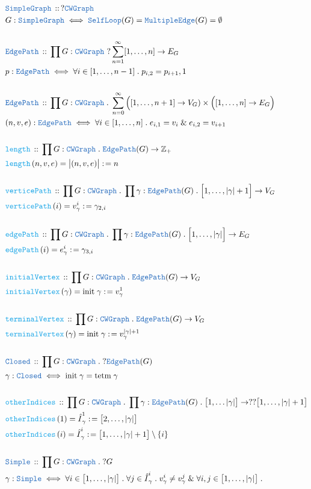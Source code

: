 \documentclass[12pt]{scrartcl}
\newcommand{\TYPE}[1]{\textcolor{NavyBlue}{\mathtt{#1}}}
\newcommand{\FUNC}[1]{\textcolor{Cerulean}{\mathtt{#1}}}
\renewcommand{\.}{\; . \;}
\newcommand{\de}{: \kern 0.1pc =}
\newcommand{\Act}[1]{\left( #1 \right)}
\newcommand{\DeclareType}[2]{& \TYPE{#1} \, :: \, #2 \\}
\newcommand{\DefineType}[3]{& #1 : \TYPE{#2} \iff #3 \\}
\newcommand{\DeclareFunc}[2]{& \FUNC{#1} \, :: \, #2 \\}
\newcommand{\DefineNamedFunc}[4]{&  \FUNC{#1}\Act{#2} = #3 \de #4 \\}
\newcommand{\Page}[1]{ \begin{align*} #1 \end{align*}   }
\renewcommand{\And}{\; \& \;}
\newcommand{\Int}{\mathbb{Z} }
\begin{document}
{}\Page{
	\DeclareType{SimpleGraph}{ ? \TYPE{CWGraph} }
	\DefineType{G}{SimpleGraph}{\TYPE{SelfLoop}(G) = \TYPE{MultipleEdge}(G) = \emptyset }
	\\
	\DeclareType{EdgePath}{\prod G : \TYPE{CWGraph} \ ? \sum^\infty_{n=1} [1,\ldots,n] \to E_G}
	\DefineType{p}{EdgePath}{\forall i \in [1,\ldots,n-1] \. p_{i,2} = p_{i+1},1}
	\\
	\DeclareType{EdgePath}{
		\prod G : \TYPE{CWGraph} \.  
		\sum^\infty_{n=0} 
		\Big([1,\ldots,n+1] \to V_G) \times
		\Big([1,\ldots,n] \to E_G \Big) 
	}
	\DefineType{(n,v,e)}{EdgePath}{\forall i \in [1,\ldots,n] \. e_{i,1} = v_i \And e_{i,2} = v_{i+1} }
	\\
	\DeclareFunc{length}{\prod G : \TYPE{CWGraph} \. \TYPE{EdgePath}(G) \to \Int_+}
	\DefineNamedFunc{length}{n,v,e}{\big|(n,v,e)\big|}{n}
	\\
	\DeclareFunc{verticePath}{\prod G : \TYPE{CWGraph} \. \prod \gamma :  \TYPE{EdgePath}(G) \. \Big[1,\ldots,|\gamma|+1\Big] \to V_G}
	\DefineNamedFunc{verticePath}{i}{v_\gamma^i}{\gamma_{2,i}} 
	\\
	\DeclareFunc{edgePath}{\prod G : \TYPE{CWGraph} \. \prod \gamma :  \TYPE{EdgePath}(G) \. \Big[1,\ldots,|\gamma|\Big] \to E_G}
	\DefineNamedFunc{edgePath}{i}{e_\gamma^i}{\gamma_{3,i}}
	\\
	\DeclareFunc{initialVertex}{\prod G : \TYPE{CWGraph} \. \TYPE{EdgePath}(G) \to V_G}
	\DefineNamedFunc{initialVertex}{\gamma}{\mathrm{init}\;\gamma}{v_\gamma^1}
	\\
	\DeclareFunc{terminalVertex}{\prod G : \TYPE{CWGraph} \. \TYPE{EdgePath}(G) \to V_G}
	\DefineNamedFunc{terminalVertex}{\gamma}{\mathrm{init}\;\gamma}{v_\gamma^{|\gamma| + 1}}
	\\
	\DeclareType{Closed}{\prod G : \TYPE{CWGraph} \. ?\TYPE{EdgePath}(G)}
	\DefineType{\gamma}{Closed}{\mathrm{init}\; \gamma = \mathrm{tetm} \; \gamma}
	\\
	\DeclareFunc{otherIndices}{\prod G : \TYPE{CWGraph} \. \prod \gamma : \TYPE{EdgePath}(G) \. 
		\big[1,\ldots |\gamma|\big] \to ??\big[1,\ldots,|\gamma| + 1\big] }
	\DefineNamedFunc{otherIndices}{1}{{\hat I }^1_\gamma}{\big[2,\ldots,|\gamma|\big]}
	\DefineNamedFunc{otherIndices}{i}{{\hat I}^i_\gamma}{ \big[1, \ldots, |\gamma| +1\big] \setminus \{i\}  }
	\\
	\DeclareType{Simple}{\prod G : \TYPE{CWGraph} \. ?G}
	\DefineType{\gamma}{Simple}{
		\forall i \in \big[1,\ldots,|\gamma|\big] \. 
		\forall j \in {\hat I}^i_\gamma \. 
		v_\gamma^i \neq v_\gamma^j
		\And
		\forall i,j \in \big[1,\ldots,|\gamma|\big] \.
}}
\end{document}
